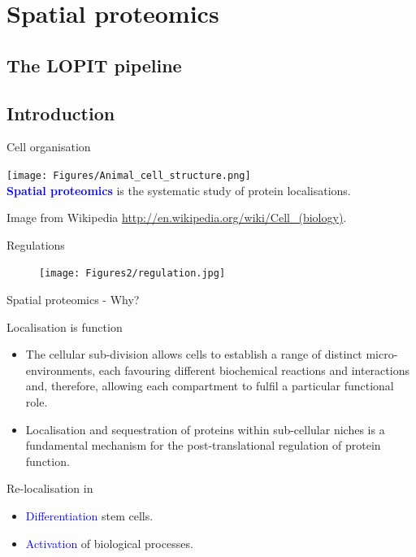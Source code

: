 \section{Spatial proteomics}

\subsection{The LOPIT pipeline}

\subsection*{Introduction}


\label{sec:spspatprot}

\begin{frame}{Cell organisation}
  \begin{center}
    \texttt{[image: Figures/Animal\_cell\_structure.png]} \\
    \textbf{\textcolor{Blue}{Spatial proteomics}} is the systematic
    study of protein localisations.
  \end{center}

  \tiny Image from Wikipedia
  \url{http://en.wikipedia.org/wiki/Cell_(biology)}.
\end{frame}

\begin{frame}{Regulations}
  \begin{figure}[h]
    \centering
    \texttt{[image: Figures2/regulation.jpg]}
  \end{figure}
\end{frame}

\begin{frame}{Spatial proteomics - Why?}
  \begin{block}{Localisation is function}
    \begin{itemize}
    \item The cellular sub-division allows cells to establish a range
      of distinct micro-environments, each favouring different
      biochemical reactions and interactions and, therefore, allowing
      each compartment to fulfil a particular functional role.
    \item Localisation and sequestration of proteins within
      sub-cellular niches is a fundamental mechanism for the
      post-translational regulation of protein function.
    \end{itemize}
  \end{block}
  \begin{block}{Re-localisation in}
    \begin{itemize}
    \item \textcolor{Blue}{Differentiation} stem cells.
    \item \textcolor{Blue}{Activation} of biological processes.
    \end{itemize}
  \end{block}
\end{frame}

